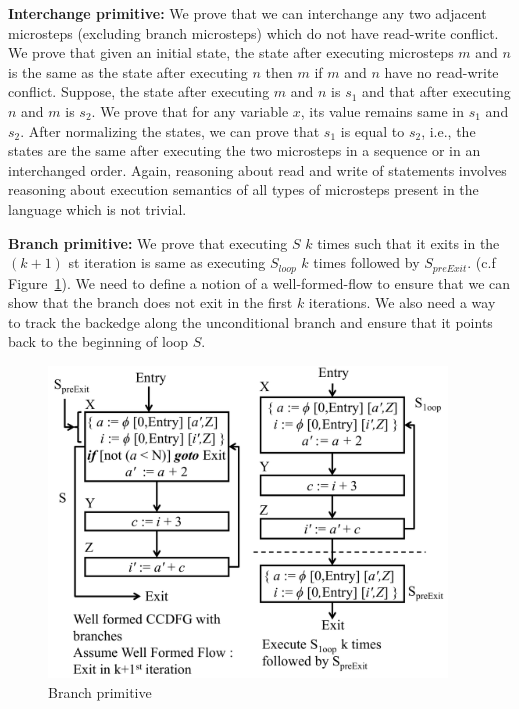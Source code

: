  
  {\bf Interchange primitive:} We prove that we can interchange any two adjacent microsteps
 (excluding branch microsteps) which do not have read-write conflict. We prove that given an initial state, 
 the state after executing microsteps $m$ and $n$ is the same as the state after
  executing $n$ then $m$ if $m$ and $n$ have no read-write
  conflict. Suppose, the state after executing $m$ and $n$ is $s_1$ and 
  that after executing $n$ and $m$ is $s_2$. We prove that for any variable $x$, its
  value remains same in $s_1$ and $s_2$. After normalizing
  the states, we can prove that $s_1$ is equal to $s_2$, i.e.,
  the states are the same after executing the two microsteps in
  a sequence or in an interchanged order. Again, reasoning about read and
  write of statements involves reasoning about execution
  semantics of all types of microsteps present in the
  language which is not trivial.




{\bf Branch primitive:} We prove that executing $S$ $k$ times such that it exits 
in the $(k+1)$ st iteration is same as executing $S_{loop}$ $k$ times followed by $S_{preExit}$. 
(c.f Figure~\ref{fig:primitives3}). We need to define a notion of a well-formed-flow to ensure that we can show that the 
branch does not exit in the first $k$ iterations. We also need a way to track the backedge along the 
unconditional branch and ensure that it points back to the beginning of loop $S$.
  
\begin{figure}[t!]
\begin{center}
\includegraphics[height=3.25in]{fig-proposal/conditional-branch-primitive}
\end{center}
\caption{Branch primitive}
\label{fig:primitives3}
\end{figure} 
 
